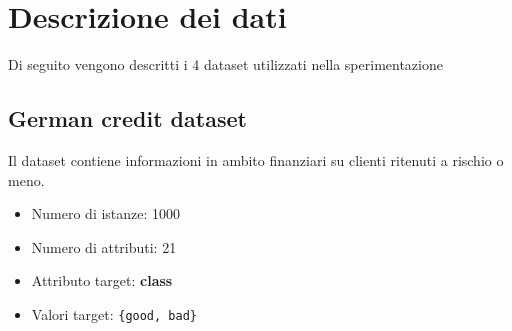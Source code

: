 \chapter{Descrizione dei dati}
\label{ch:data}

Di seguito vengono descritti i 4 dataset utilizzati nella sperimentazione

\section{German credit dataset}
Il dataset contiene informazioni in ambito finanziari su clienti ritenuti a rischio o meno.


\begin{itemize}
	\item Numero di istanze: 1000
	\item Numero di attributi: 21
	\item Attributo target: \textbf{class}
	\item Valori target: \texttt{\{good, bad\}}
\end{itemize}

